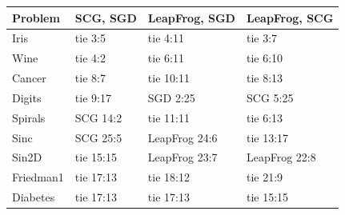 \begin{tabular}{@{}l lll@{}}
\toprule
Problem & SCG, SGD & LeapFrog, SGD & LeapFrog, SCG \\
\midrule
Iris & tie 3:5 & tie 4:11 & tie 3:7 \\
Wine & tie 4:2 & tie 6:11 & tie 6:10 \\
Cancer & tie 8:7 & tie 10:11 & tie 8:13 \\
Digits & tie 9:17 & SGD 2:25 & SCG 5:25 \\
Spirals & SCG 14:2 & tie 11:11 & tie 6:13 \\
Sinc & SCG 25:5 & LeapFrog 24:6 & tie 13:17 \\
Sin2D & tie 15:15 & LeapFrog 23:7 & LeapFrog 22:8 \\
Friedman1 & tie 17:13 & tie 18:12 & tie 21:9 \\
Diabetes & tie 17:13 & tie 17:13 & tie 15:15 \\
\bottomrule
\end{tabular}
